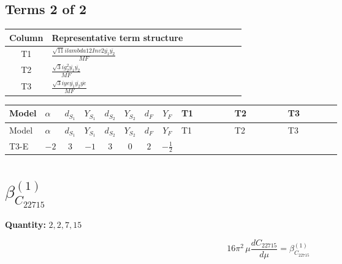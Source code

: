 \documentclass[8pt]{article}
\begin{document}
\begin{landscape}
\subsection*{Terms 2 of 2}
\begin{center}
\begin{tabular}{@{}c >{\raggedright\arraybackslash}p{0.82\linewidth}@{}}
\toprule
Column & Representative term structure \\
\midrule
T1 & \(\displaystyle \frac{\sqrt{11} i lambda12Inv2 \overline{y_{1}} \overline{y_{2}}}{MF}\) \\
\midrule
T2 & \(\displaystyle \frac{\sqrt{3} i g_{2}^{2} \overline{y_{1}} \overline{y_{2}}}{MF}\) \\
\midrule
T3 & \(\displaystyle \frac{\sqrt{3} i ye \overline{y_{1}} \overline{y_{2}} \overline{ye}}{MF}\) \\
\midrule
\bottomrule
\end{tabular}
\end{center}
\smallskip
\tiny
\begin{longtable}{@{}llcccccc >{\raggedright\arraybackslash}p{0.21\linewidth} >{\raggedright\arraybackslash}p{0.21\linewidth} >{\raggedright\arraybackslash}p{0.21\linewidth}@{}}
\toprule
Model & $\alpha$ & $d_{S_1}$ & $Y_{S_1}$ & $d_{S_2}$ & $Y_{S_2}$ & $d_F$ & $Y_F$ & T1 & T2 & T3 \\
\midrule
\endfirsthead
\toprule
Model & $\alpha$ & $d_{S_1}$ & $Y_{S_1}$ & $d_{S_2}$ & $Y_{S_2}$ & $d_F$ & $Y_F$ & T1 & T2 & T3 \\
\midrule
\endhead
T3-E & $-2$ & $3$ & $-1$ & $3$ & $0$ & $2$ & $-\frac{1}{2}$ & \scriptsize\adjustbox{max width=\linewidth}{$\begin{gathered} \frac{3 \sqrt{11} i lambda12Inv2 \overline{y_{1}} \overline{y_{2}}}{22 MF}\end{gathered}$} & \scriptsize\adjustbox{max width=\linewidth}{$\begin{gathered} \frac{11 \sqrt{3} i g_{2}^{2} \overline{y_{1}} \overline{y_{2}}}{8 MF}\end{gathered}$} & \scriptsize\adjustbox{max width=\linewidth}{$\begin{gathered} - \frac{\sqrt{3} i ye \overline{y_{1}} \overline{y_{2}} \overline{ye}}{12 MF}\end{gathered}$} \\
\midrule
\bottomrule
\end{longtable}
\clearpage
\section*{$\beta_{C_{22715}}^{(1)}$}
\noindent\textbf{Quantity: }$\mathrm{2,2,7,15}$\par\smallskip
\[16\pi^2\,\mu\frac{d C_{22715}}{d\mu}=\beta_{C_{22715}}^{(1)}\]

\end{landscape}
\end{document}
